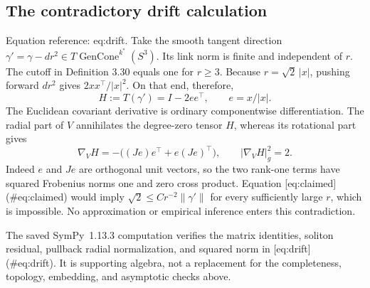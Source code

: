 \documentclass[10pt]{article}
\begin{document}
\subsection*{The contradictory drift calculation}
Equation reference: eq:drift. Take the smooth tangent direction \(\gamma'=\gamma-dr^2\in T\operatorname{GenCone}^{k^*}(S^3)\). Its link norm is finite and independent of \(r\). The cutoff in Definition 3.30 equals one for \(r\geq3\). Because \(r=\sqrt2\,|x|\), pushing forward \(dr^2\) gives \(2xx^\top/|x|^2\). On that end, therefore, \[H:=T(\gamma')=I-2ee^\top,\qquad e=x/|x|.\] The Euclidean covariant derivative is ordinary componentwise differentiation. The radial part of \(V\) annihilates the degree-zero tensor \(H\), whereas its rotational part gives \[
 \nabla_VH=-\bigl((Je)e^\top+e(Je)^\top\bigr),\qquad
 |\nabla_VH|_g^2=2.\] Indeed \(e\) and \(Je\) are orthogonal unit vectors, so the two rank-one terms have squared Frobenius norms one and zero cross product. Equation [eq:claimed] (\#eq:claimed) would imply \(\sqrt2\leq C r^{-2}\|\gamma'\|\) for every sufficiently large \(r\), which is impossible. No approximation or empirical inference enters this contradiction.\par
The saved SymPy 1.13.3 computation verifies the matrix identities, soliton residual, pullback radial normalization, and squared norm in [eq:drift] (\#eq:drift). It is supporting algebra, not a replacement for the completeness, topology, embedding, and asymptotic checks above.\par
\end{document}
